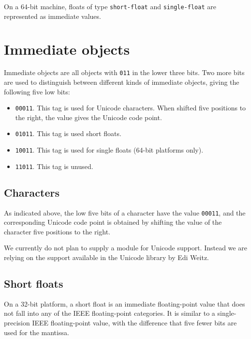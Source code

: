 On a 64-bit machine, floats of type \texttt{short-float} and
\texttt{single-float} are represented as immediate values.


\section{Immediate objects}
\label{sec-data-representation-immediate-objects}

Immediate objects are all objects with \texttt{011} in the lower three
bits.  Two more bits are used to distinguish between different kinds
of immediate objects, giving the following five low bits:

\begin{itemize}
\item \texttt{00011}.  This tag is used for Unicode characters.  When
  shifted five positions to the right, the value gives the Unicode
  code point.
\item \texttt{01011}.  This tag is used short floats.
\item \texttt{10011}.  This tag is used for single floats (64-bit
  platforms only).
\item \texttt{11011}.  This tag is unused.
\end{itemize}

\subsection{Characters}

As indicated above, the low five bits of a character have the value
\texttt{00011}, and the corresponding Unicode code point is obtained by
shifting the value of the character five positions to the right.

We currently do not plan to supply a module for Unicode support.
Instead we are relying on the support available in the Unicode library
by Edi Weitz.

\subsection{Short floats}

On a 32-bit platform, a short float is an immediate floating-point
value that does not fall into any of the IEEE floating-point
categories.  It is similar to a single-precision
IEEE floating-point value, with the difference that five fewer bits
are used for the mantissa.

